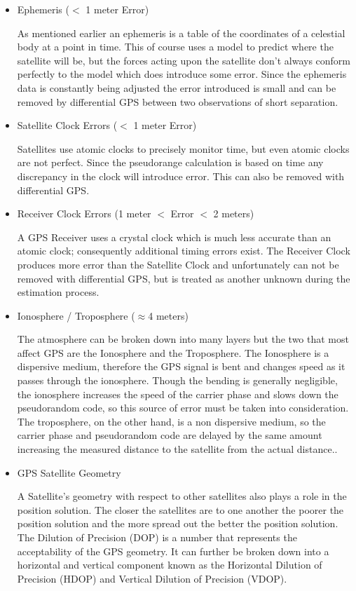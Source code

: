 \begin{itemize}
	\item Ephemeris ($<$ 1 meter Error)

As mentioned earlier an ephemeris is a table of the coordinates of a celestial body at a point in time. This of course uses a model to predict where the satellite will be, but the forces acting upon the satellite don't always conform perfectly to the model which does introduce some error.  Since the ephemeris data is constantly being adjusted the error introduced is small and can be removed by differential GPS between two observations of short separation.

	\item Satellite Clock Errors ($<$ 1 meter Error)

Satellites use atomic clocks to precisely monitor time, but even atomic clocks are not perfect.  Since the pseudorange calculation is based on time any discrepancy in the clock will introduce error.  This can also be removed with differential GPS.

	\item Receiver Clock Errors (1 meter $<$ Error $<$ 2 meters)

A GPS Receiver uses a crystal clock which is much less accurate than an atomic clock; consequently additional timing errors exist.  The Receiver Clock produces more error than the Satellite Clock and unfortunately can not be removed with differential GPS, but is treated as another unknown during the estimation process.

	\item Ionosphere / Troposphere ($\approx$4 meters)

The atmosphere can be broken down into many layers but the two that most affect GPS are the Ionosphere and the Troposphere.  The Ionosphere is a dispersive medium, therefore the GPS signal is bent and changes speed as it passes through the ionosphere. Though the bending is generally negligible, the ionosphere increases the speed of the carrier phase and slows down the pseudorandom code, so this source of error must be taken into consideration.  The troposphere, on the other hand, is a non dispersive medium, so the carrier phase and pseudorandom code are delayed by the same amount increasing the measured distance to the satellite from the actual distance.\cite[]{EL-RABBANY}.

 	\item GPS Satellite Geometry

A Satellite's geometry with respect to other satellites also plays a role in the position solution.  The closer the satellites are to one another the poorer the position solution and the more spread out the better the position solution.  The Dilution of Precision (DOP) is a number that represents the acceptability of the GPS geometry.  It can further be broken down into a horizontal and vertical component known as the Horizontal Dilution of Precision (HDOP) and Vertical Dilution of Precision (VDOP).


\end{itemize}
